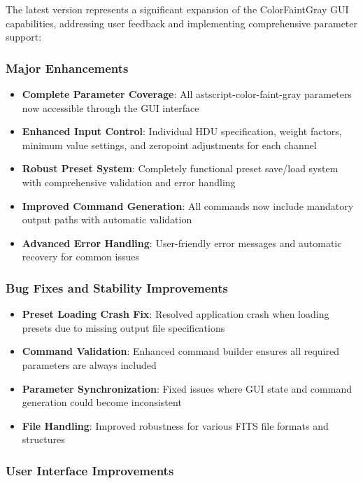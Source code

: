 \documentclass[11pt,a4paper]{article}
\begin{document}
The latest version represents a significant expansion of the ColorFaintGray 
GUI capabilities, addressing user feedback and implementing comprehensive 
parameter support:

\subsubsection{Major Enhancements}

\begin{itemize}[leftmargin=*]
\item \textbf{Complete Parameter Coverage}: All astscript-color-faint-gray
parameters now accessible through the GUI interface
\item \textbf{Enhanced Input Control}: Individual HDU specification, weight
factors, minimum value settings, and zeropoint adjustments for each channel
\item \textbf{Robust Preset System}: Completely functional preset save/load
system with comprehensive validation and error handling
\item \textbf{Improved Command Generation}: All commands now include
mandatory output paths with automatic validation
\item \textbf{Advanced Error Handling}: User-friendly error messages and
automatic recovery for common issues
\end{itemize}

\subsubsection{Bug Fixes and Stability Improvements}

\begin{itemize}[leftmargin=*]
\item \textbf{Preset Loading Crash Fix}: Resolved application crash when
loading presets due to missing output file specifications
\item \textbf{Command Validation}: Enhanced command builder ensures all
required parameters are always included
\item \textbf{Parameter Synchronization}: Fixed issues where GUI state and
command generation could become inconsistent
\item \textbf{File Handling}: Improved robustness for various FITS file
formats and structures
\end{itemize}

\subsubsection{User Interface Improvements}
\end{document}
